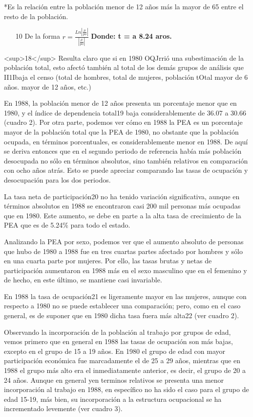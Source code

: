 \documentclass{article}
\begin{document}
*Es la relación entre la población menor de 12 años más la mayor de 65 entre el resto de la población.
\begin{itemize}
\item 
[10] De la forma $r=\frac{Ln\left|\frac{\mu}{po}\right|}{\left|\frac{\mu}{po}\right|}$ \textbf{Donde: t = a 8.24 aros.}

\end{itemize}

<sup>18</sup> Resulta claro que si en 1980 OQJrrió una subestimación de la población total, esto afectó también al total de los demás grupos de análisis que II1Ibaja el censo (total de hombres, total de mujeres, población tOtal mayor de 6 años. mayor de 12 años, etc.)

En 1988, la población menor de 12 años presenta un porcentaje menor que en 1980, y el índice de dependencia total19 baja considerablemente de 36.07 a 30.66 (cuadro 2). Por otra parte, podemos ver cómo en 1988 la PEA es un porcentaje mayor de la población total que la PEA de 1980, no obstante que la población ocupada, en términos porcentuales, es considerablemente menor en 1988. De aquí se deriva entonces que en el segundo periodo de referencia había más población desocupada no sólo en términos absolutos, sino también relativos en comparación con ocho años atrás. Esto se puede apreciar comparando las tasas de ocupación y desocupación para los dos periodos.

La tasa neta de participación20 no ha tenido variación significativa, aunque en términos absolutos en 1988 se encontraron casi 200 mil personas más ocupadas que en 1980. Este aumento, se debe en parte a la alta tasa de crecimiento de la PEA que es de 5.24\% para todo el estado.

Analizando la PEA por sexo, podemos ver que el aumento absoluto de personas que hubo de 1980 a 1988 fue en tres cuartas partes afectado por hombres y sólo en una cuarta parte por mujeres. Por ello, las tasas brutas y netas de participación aumentaron en 1988 más en el sexo masculino que en el femenino y de hecho, en este último, se mantiene casi invariable.

En 1988 la tasa de ocupación21 es ligeramente mayor en las mujeres, aunque con respecto a 1980 no se puede establecer una comparación; pero, como en el caso general, es de suponer que en 1980 dicha tasa fuera más alta22 (ver cuadro 2).

Observando la incorporación de la población al trabajo por grupos de edad, vemos primero que en general en 1988 las tasas de ocupación son más bajas, excepto en el grupo de 15 a 19 años. En 1980 el grupo de edad con mayor participación económica fue marcadamente el de 25 a 29 años, mientras que en 1988 el grupo más alto era el inmediatamente anterior, es decir, el grupo de 20 a 24 años. Aunque en general yen terminos relativos se presenta una menor incorporación al trabajo en 1988, en específico no ha sido el caso para el grupo de edad 15-19, más bien, su incorporación a la estructura ocupacional se ha incrementado levemente (ver cuadro 3).
\end{document}
